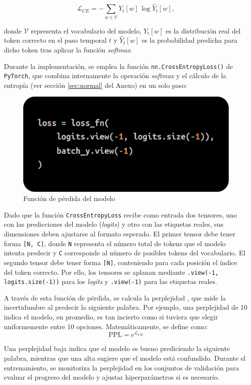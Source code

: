 \documentclass[11pt]{book}
\theoremstyle{plain}
\theoremstyle{definition}
\begin{document}
\[
\mathcal{L}_{CE} = - \sum_{w \in \mathcal{V}} Y_t[w] \, \log \hat{Y}_t[w],
\]

donde $\mathcal{V}$ representa el vocabulario del modelo, $Y_t[w]$ es la distribución real del token correcto en el paso temporal $t$ y $\hat{Y}_t[w]$ es la probabilidad predicha para dicho token tras aplicar la función \textit{softmax}.

Durante la implementación, se emplea la función \texttt{nn.CrossEntropyLoss()} de \texttt{PyTorch}, que combina internamente la operación \textit{softmax} y el cálculo de la entropía (ver sección \ref{sec:normal} del Anexo) en un solo paso:

\begin{figure}[h]
    \centering
    \includegraphics[width=0.5\linewidth]{img/cross_entropy.png}
    \caption{Función de pérdida del modelo \parencite{geeksforgeeks_crossentropy}}
    \label{fig:placeholder20}
\end{figure}

Dado que la función \texttt{CrossEntropyLoss} recibe como entrada dos tensores, uno con las predicciones del modelo (\textit{logits}) y otro con las etiquetas reales, sus dimensiones deben ajustarse al formato esperado. El primer tensor debe tener forma \texttt{[N, C]}, donde \texttt{N} representa el número total de tokens que el modelo intenta predecir y \texttt{C} corresponde al número de posibles tokens del vocabulario. El segundo tensor debe tener forma \texttt{[N]}, conteniendo para cada posición el índice del token correcto. Por ello, los tensores se aplanan mediante \texttt{.view(-1, logits.size(-1))} para los \textit{logits} y \texttt{.view(-1)} para las etiquetas reales.

A través de esta función de pérdida, se calcula la perplejidad \parencite{keerthanams2025evaluating}, que mide la incertidumbre al predecir la siguiente palabra. Por ejemplo, una perplejidad de 10 indica el modelo, en promedio, es tan incierto como si tuviera que elegir uniformemente entre 10 opciones. Matemáticamente, se define como:
\[
\text{PPL} = e^{\mathcal{L}_{CE}}
\]

Una perplejidad baja indica que el modelo es bueno prediciendo la siguiente palabra, mientras que una alta sugiere que el modelo está confundido. Durante el entrenamiento, se monitoriza la perplejidad en los conjuntos de validación para evaluar el progreso del modelo y ajustar hiperparámetros si es necesario.
\end{document}
